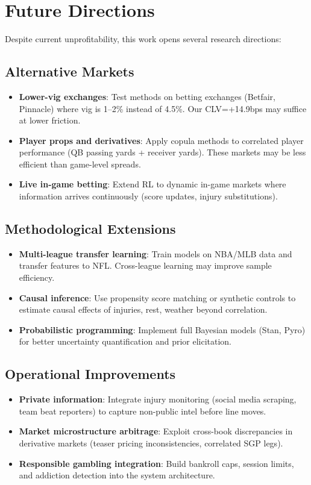 \section{Future Directions}

Despite current unprofitability, this work opens several research directions:

\subsection{Alternative Markets}
\begin{itemize}
  \item \textbf{Lower-vig exchanges}: Test methods on betting exchanges (Betfair, Pinnacle) where vig is 1--2\% instead of 4.5\%. Our CLV=+14.9bps may suffice at lower friction.
  \item \textbf{Player props and derivatives}: Apply copula methods to correlated player performance (QB passing yards + receiver yards). These markets may be less efficient than game-level spreads.
  \item \textbf{Live in-game betting}: Extend RL to dynamic in-game markets where information arrives continuously (score updates, injury substitutions).
\end{itemize}

\subsection{Methodological Extensions}
\begin{itemize}
  \item \textbf{Multi-league transfer learning}: Train models on NBA/MLB data and transfer features to NFL. Cross-league learning may improve sample efficiency.
  \item \textbf{Causal inference}: Use propensity score matching or synthetic controls to estimate causal effects of injuries, rest, weather beyond correlation.
  \item \textbf{Probabilistic programming}: Implement full Bayesian models (Stan, Pyro) for better uncertainty quantification and prior elicitation.
\end{itemize}

\subsection{Operational Improvements}
\begin{itemize}
  \item \textbf{Private information}: Integrate injury monitoring (social media scraping, team beat reporters) to capture non-public intel before line moves.
  \item \textbf{Market microstructure arbitrage}: Exploit cross-book discrepancies in derivative markets (teaser pricing inconsistencies, correlated SGP legs).
  \item \textbf{Responsible gambling integration}: Build bankroll caps, session limits, and addiction detection into the system architecture.
\end{itemize}

